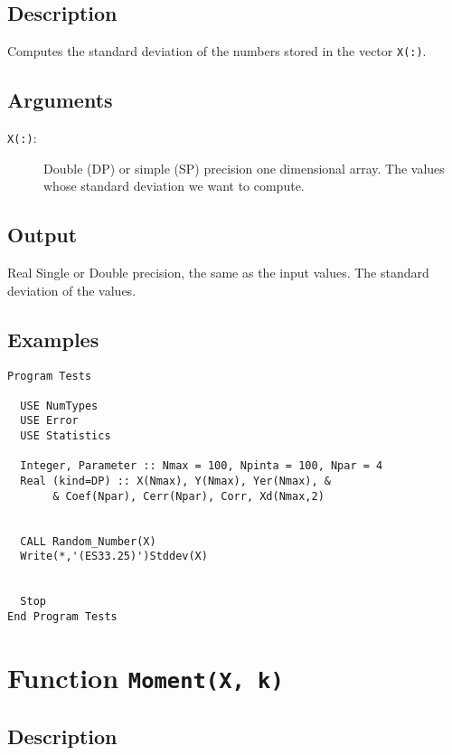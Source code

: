 \subsection{Description}

Computes the standard deviation of the numbers stored in the vector
\texttt{X(:)}. 

\subsection{Arguments}

\begin{description}
\item[\texttt{X(:)}:] Double (DP) or simple (SP) precision one
  dimensional array. The values  whose standard deviation we want to
  compute. 
\end{description}

\subsection{Output}

Real Single or Double precision, the same as the input values. The
standard deviation of the values.

\subsection{Examples}

\begin{lstlisting}[emph=Stddev,
                   emphstyle=\color{blue},
                   frame=trBL,
                   caption=Compputing the standard deviation.,
                   label=stddev]
Program Tests

  USE NumTypes
  USE Error
  USE Statistics

  Integer, Parameter :: Nmax = 100, Npinta = 100, Npar = 4
  Real (kind=DP) :: X(Nmax), Y(Nmax), Yer(Nmax), &
       & Coef(Npar), Cerr(Npar), Corr, Xd(Nmax,2)


  CALL Random_Number(X)
  Write(*,'(ES33.25)')Stddev(X)


  Stop
End Program Tests
\end{lstlisting}

\section{Function \texttt{Moment(X, k)}}

\subsection{Description}

